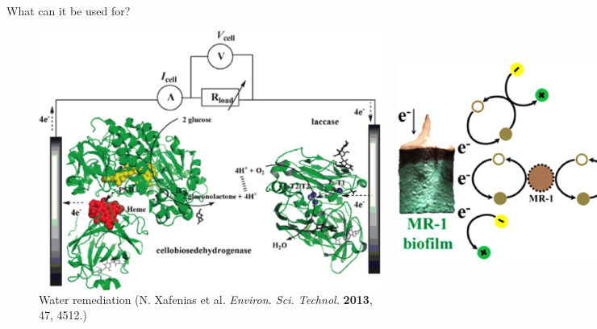 \documentclass{beamer}
\begin{document}
\begin{frame}{What can it be used for?}
\begin{figure}
\begin{columns}
	\centering
	\includegraphics[height=.35\textheight]{Pics/biofuel.png} 
	\caption{{\scriptsize Bio-fuel cell} {\tiny (V. Coman et al. \emph{PCCP}, \textbf{2008}, 10, 6093.)}}
	\vspace{.1cm}
	\includegraphics[height=.25\textheight]{Pics/water.png}
	\caption{{\scriptsize Water remediation} {\tiny (N. Xafenias et al. \emph{Environ. Sci. Technol.} \textbf{2013}, 47, 4512.)}}
	

\end{columns}
\end{figure}
\end{frame}
\end{document}
